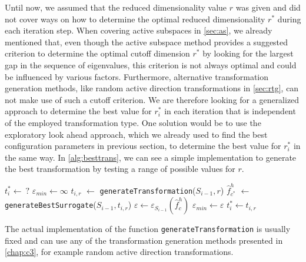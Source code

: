 \documentclass[
  a4paper,  %
  twoside,  %
  bibliography=totoc,
  headsepline,
  cleardoublepage=empty,
  parskip=half,
  draft=false
]{scrbook}
\begin{document}
Until now, we assumed that the reduced dimensionality value $r$ was given and did not cover ways on how to determine the optimal reduced dimensionality $r^\ast$ during each iteration step.
When covering active subspaces in \cref{sec:as}, we already mentioned that, even though the active subspace method provides a suggested criterion to determine the optimal cutoff dimension $r^\ast$ by looking for the largest gap in the sequence of eigenvalues, this criterion is not always optimal and could be influenced by various factors.
Furthermore, alternative transformation generation methods, like random active direction transformations in \cref{sec:rtg}, can not make use of such a cutoff criterion.
We are therefore looking for a generalized approach to determine the best value for $r^\ast_i$ in each iteration that is independent of the employed transformation type.
One solution would be to use the exploratory look ahead approach, which we already used to find the best configuration parameters in previous section, to determine the best value for $r^\ast_i$ in the same way.
In \cref{alg:besttrans}, we can see a simple implementation to generate the best transformation by testing a range of possible values for $r$.

\begin{mdframed}[style=algstyle,frametitle={\textbf{function} \texttt{generateBestTransformation}{$(S_{i - 1}, r_{\text{min}} ,r_{\text{max}})$}}]
\normalsize
\vspace{5.5mm}
\begin{algorithmic}[1]
    \State $t_i^\ast \gets ~ ?$
    \State $\varepsilon_{min} \gets \infty$
      \State $t_{i, r}$ $\gets$ \texttt{generateTransformation}($S_{i - 1}, r$)
      \State $\hat{f}_{c^\ast}^h$ $\gets$ \texttt{generateBestSurrogate}($S_{i - 1}, t_{i, r}$)
    	\State $\varepsilon \gets \varepsilon_{S_{i - 1}}(\hat{f}_c^h)$
    	  \State $\varepsilon_{min}\gets \varepsilon$
    	\State $t_i^\ast \gets t_{i, r}$
    	\EndIf
    \EndFor
    \State {}
\end{algorithmic}
\vspace{-1.5mm}
\delimit
	\label{alg:besttrans}
\end{mdframed}
%
The actual implementation of the function \texttt{generateTransformation} is usually fixed and can use any of the transformation generation methods presented in \cref{chap:c3}, for example random active direction transformations.
\end{document}
